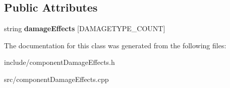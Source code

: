 \subsection*{\-Public \-Attributes}
\begin{DoxyCompactItemize}
\item 
\hypertarget{classComponentTemplateDamageEffects_a68022fe96905b7117ee3bf784d74c8bc}{
string {\bfseries damage\-Effects} \mbox{[}\-D\-A\-M\-A\-G\-E\-T\-Y\-P\-E\-\_\-\-C\-O\-U\-N\-T\mbox{]}}
\label{d6/d39/classComponentTemplateDamageEffects_a68022fe96905b7117ee3bf784d74c8bc}

\end{DoxyCompactItemize}


\-The documentation for this class was generated from the following files\-:\begin{DoxyCompactItemize}
\item 
include/component\-Damage\-Effects.\-h\item 
src/component\-Damage\-Effects.\-cpp\end{DoxyCompactItemize}
